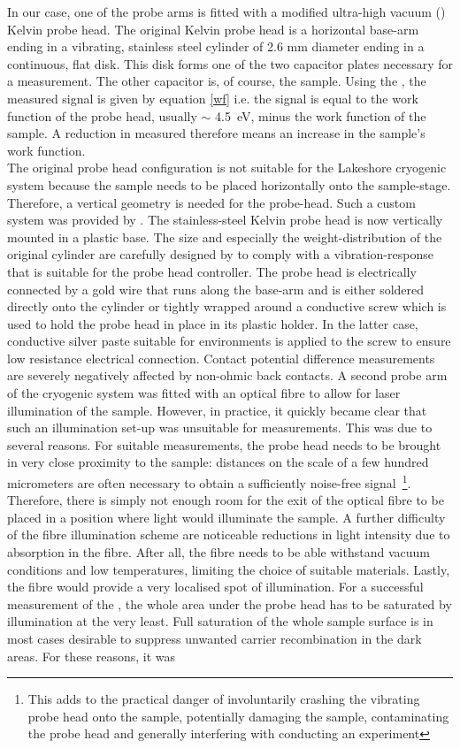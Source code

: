 In our case, one of the probe arms is fitted with a modified \McA{} ultra-high vacuum (\uhv{}) Kelvin probe head. The original \McA{} \uhv{} Kelvin probe head is a horizontal base-arm ending in a vibrating, stainless steel cylinder of 2.6 mm diameter ending in a continuous, flat disk. This disk forms one of the two capacitor plates necessary for a \cpd{} measurement. The other capacitor is, of course, the sample. Using the \McA{}, the measured signal is given by equation \eqref{wf} i.e. the signal is equal to the work function of the probe head, usually $\sim$ \SI{4.5}{\electronvolt}, minus the work function of the sample. A reduction in measured \cpd{} therefore means an increase in the sample's work function.\\
The original probe head configuration is not suitable for the Lakeshore cryogenic system because the sample needs to be placed horizontally onto the sample-stage. Therefore, a vertical geometry is needed for the probe-head. Such a custom system was provided by \McA{}. The stainless-steel Kelvin probe head is now vertically mounted in a plastic base. The size and especially the weight-distribution of the original cylinder are carefully designed by \McA{} to comply with a vibration-response that is suitable for the probe head controller. The probe head is electrically connected by a gold wire that runs along the base-arm and is either soldered directly onto the cylinder or tightly wrapped around a conductive screw which is used to hold the probe head in place in its plastic holder. In the latter case, conductive silver paste suitable for \uhv{} environments is applied to the screw to ensure low resistance electrical connection. Contact potential difference measurements are severely negatively affected by non-ohmic back contacts. A second probe arm of the cryogenic system was fitted with an optical fibre to allow for laser illumination of the sample. However, in practice, it quickly became clear that such an illumination set-up was unsuitable for \spv{} measurements. This was due to several reasons. For suitable \cpd{} measurements, the probe head needs to be brought in very close proximity to the sample: distances on the scale of a few hundred micrometers are often necessary to obtain a sufficiently noise-free signal~\footnote{This adds to the practical danger of involuntarily crashing the vibrating probe head onto the sample, potentially damaging the sample, contaminating the probe head and generally interfering with conducting an experiment}. Therefore, there is simply not enough room for the exit of the optical fibre to be placed in a position where light would illuminate the sample. A further difficulty of the fibre illumination scheme are noticeable reductions in light intensity due to absorption in the fibre. After all, the fibre needs to be able withstand vacuum conditions and low temperatures, limiting the choice of suitable materials. Lastly, the fibre would provide a very localised spot of illumination. For a successful measurement of the \spv{}, the whole area under the probe head has to be saturated by illumination at the very least. Full saturation of the whole sample surface is in most cases desirable to suppress unwanted carrier recombination in the dark areas. For these reasons, it was 